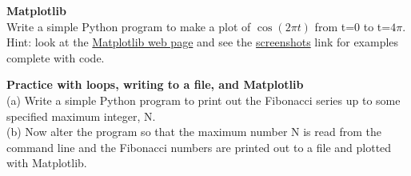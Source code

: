 \begin{prob}
\label{prob1.3}
\textbf{Matplotlib}\\
Write a simple Python program to make a plot of $\cos(2\pi t)$ from t=0 to t=$4\pi$. Hint: look at the \href{http://matplotlib.sourceforge.net/}{Matplotlib web page} and see the \href{http://matplotlib.sourceforge.net/screenshots.html}{screenshots} link for examples complete with code.
\end{prob}

\begin{prob}
\label{prob1.4}
\textbf{Practice with loops, writing to a file, and Matplotlib}\\
(a) Write a simple Python program to print out the Fibonacci series up to some specified maximum integer, N. \\
(b) Now alter the program so that the maximum number N is read from the command line and the Fibonacci numbers are printed out to a file and plotted with Matplotlib. 

\end{prob}

%
